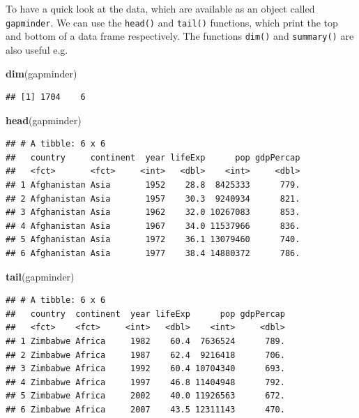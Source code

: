 \documentclass[]{book}
\newenvironment{Shaded}{\begin{snugshade}}{\end{snugshade}}
\newcommand{\KeywordTok}[1]{\textcolor[rgb]{0.13,0.29,0.53}{\textbf{{#1}}}}
\newcommand{\NormalTok}[1]{{#1}}
\theoremstyle{definition}
\theoremstyle{definition}
\theoremstyle{definition}
\theoremstyle{remark}
\begin{document}
To have a quick look at the data, which are available as an object
called \texttt{gapminder}. We can use the \texttt{head()} and
\texttt{tail()} functions, which print the top and bottom of a data
frame respectively. The functions \texttt{dim()} and \texttt{summary()}
are also useful e.g.

\begin{Shaded}
\begin{Highlighting}[]
\KeywordTok{dim}\NormalTok{(gapminder)}
\end{Highlighting}
\end{Shaded}

\begin{verbatim}
## [1] 1704    6
\end{verbatim}

\begin{Shaded}
\begin{Highlighting}[]
\KeywordTok{head}\NormalTok{(gapminder)}
\end{Highlighting}
\end{Shaded}

\begin{verbatim}
## # A tibble: 6 x 6
##   country     continent  year lifeExp      pop gdpPercap
##   <fct>       <fct>     <int>   <dbl>    <int>     <dbl>
## 1 Afghanistan Asia       1952    28.8  8425333      779.
## 2 Afghanistan Asia       1957    30.3  9240934      821.
## 3 Afghanistan Asia       1962    32.0 10267083      853.
## 4 Afghanistan Asia       1967    34.0 11537966      836.
## 5 Afghanistan Asia       1972    36.1 13079460      740.
## 6 Afghanistan Asia       1977    38.4 14880372      786.
\end{verbatim}

\begin{Shaded}
\begin{Highlighting}[]
\KeywordTok{tail}\NormalTok{(gapminder)}
\end{Highlighting}
\end{Shaded}

\begin{verbatim}
## # A tibble: 6 x 6
##   country  continent  year lifeExp      pop gdpPercap
##   <fct>    <fct>     <int>   <dbl>    <int>     <dbl>
## 1 Zimbabwe Africa     1982    60.4  7636524      789.
## 2 Zimbabwe Africa     1987    62.4  9216418      706.
## 3 Zimbabwe Africa     1992    60.4 10704340      693.
## 4 Zimbabwe Africa     1997    46.8 11404948      792.
## 5 Zimbabwe Africa     2002    40.0 11926563      672.
## 6 Zimbabwe Africa     2007    43.5 12311143      470.
\end{verbatim}
\end{document}
